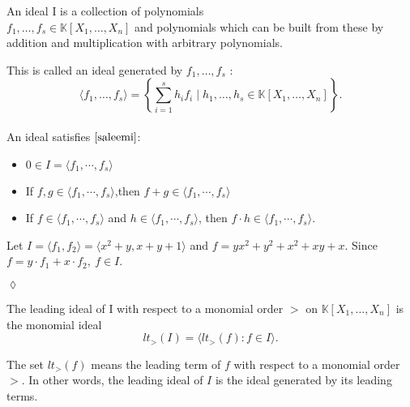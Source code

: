 \begin{env_definition}[Ideal]
\cite{KHZ}
An ideal I is a collection of polynomials \\ $f_{1},\dots ,f_{s} \in \mathbb{K}\left[X_{1}, \dots, X_{n}\right] $ and polynomials which can be built from these by addition and multiplication with arbitrary polynomials.

\end{env_definition}
This is called an ideal generated by $f_{1}, \dots , f_{s}$ : \\
\[ \langle f_{1}, \dots , f_{s} \rangle = \left\lbrace  \sum_{i=1}^s h_{i}f_{i} \mid h_{1}, \dots , h_{s} \in \mathbb{K}\left[X_{1}, \dots, X_{n}\right] \right\rbrace. \]
\\
An ideal satisfies $\cite{saleemi} $:
\begin{center}

\begin{itemize}
\item
$0 \in I = \langle f_{1}, \cdots , f_{s} \rangle$ 
\item
If $f,g \in \langle f_{1}, \cdots , f_{s} \rangle$,then  $f+g \in \langle f_{1}, \cdots , f_{s} \rangle$ 
\item
If $f \in \langle f_{1}, \cdots , f_{s} \rangle$ and $h \in  \langle f_{1}, \cdots , f_{s} \rangle$, then $f \cdot h \in \langle f_{1}, \cdots , f_{s} \rangle$.
\end{itemize}

\end{center}


\begin{env_example}\normalfont
Let $ I= \langle f_{1},f_{2} \rangle = \langle x^{2}+y, x+y+1 \rangle $ and $f=yx^{2}+y^{2}+x^{2}+xy+x$. Since $f= y \cdot f_{1} + x \cdot f_{2},~f\in I$.
\begin{flushright}
$\lozenge$
\end{flushright} 
\end{env_example}


\begin{env_definition}
\label{def:initial}
\cite{tigers} The leading ideal of I with respect to a monomial order $>$ on $\mathbb{K}\left[X_{1}, \dots, X_{n}\right]$ is the monomial ideal \\
\[lt_{>}(I) = \langle lt_{>}(f) : f \in I  \rangle . \]

\end{env_definition}
The set $lt_{>}(f)$ means the leading term of $f$ with respect to a monomial order $>$. In other words, the leading ideal of $I$ is the ideal generated by its leading terms.

